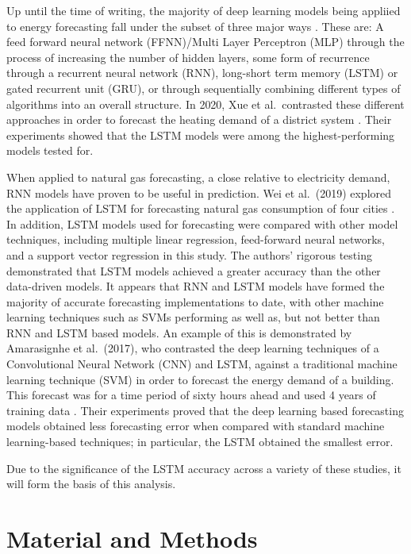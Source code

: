 \documentclass[mstat,12pt]{unswthesis}
\begin{document}
\bigskip

Up until the time of writing, the majority of deep learning models being
appliied to energy forecasting fall under the subset of three major ways
\cite{Kumar2013}. These are: A feed forward neural network (FFNN)/Multi
Layer Perceptron (MLP) through the process of increasing the number of
hidden layers, some form of recurrence through a recurrent neural
network (RNN), long-short term memory (LSTM) or gated recurrent unit
(GRU), or through sequentially combining different types of algorithms
into an overall structure. In 2020, Xue et al.~contrasted these
different approaches in order to forecast the heating demand of a
district system \cite{Xue2020}. Their experiments showed that the LSTM
models were among the highest-performing models tested for.

\bigskip

When applied to natural gas forecasting, a close relative to electricity
demand, RNN models have proven to be useful in prediction. Wei et
al.~(2019) explored the application of LSTM for forecasting natural gas
consumption of four cities \cite{Xue2020}. In addition, LSTM models used
for forecasting were compared with other model techniques, including
multiple linear regression, feed-forward neural networks, and a support
vector regression in this study. The authors' rigorous testing
demonstrated that LSTM models achieved a greater accuracy than the other
data-driven models. It appears that RNN and LSTM models have formed the
majority of accurate forecasting implementations to date, with other
machine learning techniques such as SVMs performing as well as, but not
better than RNN and LSTM based models. An example of this is
demonstrated by Amarasignhe et al.~(2017), who contrasted the deep
learning techniques of a Convolutional Neural Network (CNN) and LSTM,
against a traditional machine learning technique (SVM) in order to
forecast the energy demand of a building. This forecast was for a time
period of sixty hours ahead and used 4 years of training data
\cite{Amarasinghe2016}. Their experiments proved that the deep learning
based forecasting models obtained less forecasting error when compared
with standard machine learning-based techniques; in particular, the LSTM
obtained the smallest error.

\bigskip

Due to the significance of the LSTM accuracy across a variety of these
studies, it will form the basis of this analysis.

\hypertarget{material-and-methods}{%
\chapter{Material and Methods}\label{material-and-methods}}
\end{document}
